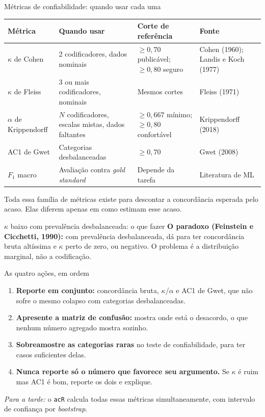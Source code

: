 \documentclass[11pt,aspectratio=169]{beamer}
\begin{document}
\begin{frame}{Métricas de confiabilidade: quando usar cada uma}
\begin{table}
\scriptsize
\begin{tabular}{p{2.0cm}p{4.0cm}p{3.7cm}p{3.0cm}}
\toprule
\textbf{Métrica} & \textbf{Quando usar} & \textbf{Corte de referência} &
\textbf{Fonte} \\
\midrule
$\kappa$ de Cohen & 2 codificadores, dados nominais &
$\geq 0{,}70$ publicável; $\geq 0{,}80$ seguro &
Cohen (1960); Landis e Koch (1977) \\
\addlinespace
$\kappa$ de Fleiss & 3 ou mais codificadores, nominais & Mesmos cortes &
Fleiss (1971) \\
\addlinespace
$\alpha$ de Krippendorff & $N$ codificadores, escalas mistas, dados faltantes &
$\geq 0{,}667$ mínimo; $\geq 0{,}80$ confortável &
Krippendorff (2018) \\
\addlinespace
AC1 de Gwet & Categorias desbalanceadas & $\geq 0{,}70$ & Gwet (2008) \\
\addlinespace
$F_1$ macro & Avaliação contra \emph{gold standard} &
Depende da tarefa & Literatura de ML \\
\bottomrule
\end{tabular}
\end{table}
\vspace{0.1cm}
\footnotesize Toda essa família de métricas existe para descontar a concordância
esperada pelo acaso. Elas diferem apenas em como estimam esse acaso.
\end{frame}

\begin{frame}{$\kappa$ baixo com prevalência desbalanceada: o que fazer}
\footnotesize \textbf{O paradoxo (Feinstein e Cicchetti, 1990):} com
prevalência desbalanceada, dá para ter concordância bruta altíssima e
$\kappa$ perto de zero, ou negativo. O problema é a distribuição marginal,
não a codificação.
\vspace{0.15cm}
\begin{alertblock}{As quatro ações, em ordem}
\begin{enumerate}\footnotesize
  \item \textbf{Reporte em conjunto:} concordância bruta, $\kappa$/$\alpha$
        e AC1 de Gwet, que não sofre o mesmo colapso com categorias
        desbalanceadas.
  \item \textbf{Apresente a matriz de confusão:} mostra onde está o
        desacordo, o que nenhum número agregado mostra sozinho.
  \item \textbf{Sobreamostre as categorias raras} no teste de
        confiabilidade, para ter casos suficientes delas.
  \item \textbf{Nunca reporte só o número que favorece seu argumento.} Se
        $\kappa$ é ruim mas AC1 é bom, reporte os dois e explique.
\end{enumerate}
\end{alertblock}
\vspace{0.1cm}
\footnotesize \textit{Para a tarde:} o \texttt{acR} calcula todas essas
métricas simultaneamente, com intervalo de confiança por \emph{bootstrap}.
\end{frame}
\end{document}
